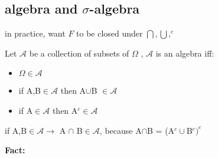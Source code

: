 \subsection{algebra and $\sigma$-algebra}
in practice, want $ F $ to be closed under $\bigcap ,\bigcup, ^c $
\begin{definition}[]{}
Let $\mathcal{A}  $ be a collection of subsets of $ \Omega   $ , $\mathcal{A}$ is an algebra iff:
\begin{itemize}
\item $ \Omega \in \mathcal{A} $
\item if A,B$\in \mathcal{A}$ then A$\cup$B $\in \mathcal{A}$
\item if A$\in \mathcal{A}$ then A$^c \in \mathcal{A}$
\end{itemize} 
\end{definition}
\begin{remark}[]{}
if A,B$ \in \mathcal{A} \rightarrow$ A $\cap$ B$ \in \mathcal{A}$, because A$ \cap $B = (A$^c \cup$B$^c)^c$ 

\end{remark}
\textbf{Fact:} 
